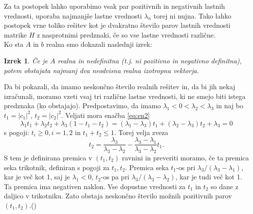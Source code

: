 \documentclass[12pt,a4paper]{amsart}
\theoremstyle{definition}
\theoremstyle{plain}
\newtheorem{izrek}[definicija]{Izrek}
\newcommand{\abs}[1]{ \left\lvert#1\right\rvert}
\begin{document}
Za ta postopek lahko uporabimo vsak par pozitivnih in negativnih lastnih vrednosti, uporaba najmanjše lastne vrednosti $\lambda_n$ torej ni nujna. Tako lahko postopek vrne toliko rešitev kot je dvakratno število parov lastnih vrednosti matrike $H$ z nasprotnimi predznaki, če so vse lastne vrednosti različne.\\
Ko sta $A$ in $b$ realna smo dokazali naslednji izrek:
\begin{izrek}
Če je $A$ realna in nedefinitna (t.j. ni pozitivno in negativno definitna), potem obstajata najmanj dva neodvisna realna izotropna vektorja.
\end{izrek}
Da bi pokazali, da imamo neskončno število realnih rešitev in, da bi jih nekaj izračunali, moramo vzeti vsaj tri različne lastne vrednosti, ki ne smejo biti istega predznaka (ko obstajajo). Predpostavimo, da imamo $\lambda_1 <0<\lambda_2<\lambda_3$ in naj bo $t_1=\abs{c_1}^2$, $t_2=\abs{c_2}^2$. Veljati mora enačba \eqref{eq:en2}
\begin{equation}\label{trije}
\lambda_1 t_1 +\lambda_2 t_2 +\lambda_3 (1- t_1 -t_2)=(\lambda_1 -\lambda_3)t_1 +(\lambda_2 -\lambda_3)t_2 +\lambda_3=0
\end{equation}
s pogoji: $t_i \ge 0, i=1,2$ in $t_1 +t_2\le1$. Torej velja zveza $$t_2=\frac{\lambda_3}{\lambda_3 - \lambda_2} -\frac{\lambda_3 -\lambda_1}{\lambda_3 -\lambda_2}t_1.$$
S tem je definirana premica v $(t_1,t_2)$ ravnini in preveriti moramo, če ta premica seka trikotnik, definiran s pogoji za $t_1,t_2$. Premica seka $t_1$-os pri $\lambda_3 /(\lambda_3 -\lambda_1)$, kar je več kot 1, saj je $\lambda_1 <0$, $t_2$-os pa pri $\lambda_3 /(\lambda_3 - \lambda_2)$, kar je tudi več kot 1. Ta premica ima negativen naklon. Vse dopustne vrednosti za $t_1$ in $t_2$ so dane z daljico v trikotniku. Zato obstaja neskončno število možnih pozitivnih parov $(t_1,t_2)$.(\cite{meurant})
\end{document}
